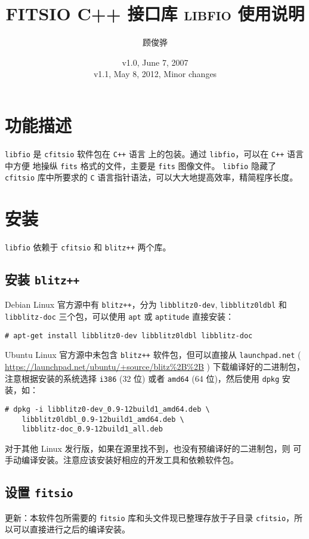 \documentclass[a4paper,12pt]{article}
\title{\textsc{FITSIO C++ 接口库 libf{}io 使用说明}}
\author{顾俊骅}
\date{v1.0, June 7, 2007 \\
  v1.1, May 8, 2012, Minor changes }
\begin{document}
\maketitle

\section{功能描述}
\texttt{libfio} 是 \texttt{cfitsio} 软件包在 \texttt{C++} 语言
上的包装。通过 \texttt{libfio}，可以在 \texttt{C++} 语言中方便
地操纵 \texttt{fits} 格式的文件，主要是 \texttt{fits} 图像文件。
\texttt{libfio} 隐藏了 \texttt{cfitsio} 库中所要求的 \texttt{C}
语言指针语法，可以大大地提高效率，精简程序长度。


\section{安装}
\texttt{libfio} 依赖于 \texttt{cfitsio} 和 \texttt{blitz++} 两个库。

\subsection{安装 \texttt{blitz++}}
Debian Linux 官方源中有 \texttt{blitz++}，分为 \texttt{libblitz0-dev},
\texttt{libblitz0ldbl} 和 \texttt{libblitz-doc} 三个包，可以使用
\texttt{apt} 或 \texttt{aptitude} 直接安装：
\begin{verbatim}
# apt-get install libblitz0-dev libblitz0ldbl libblitz-doc
\end{verbatim}

Ubuntu Linux 官方源中未包含 \texttt{blitz++} 软件包，但可以直接从
\texttt{launchpad.net} ( \url{https://launchpad.net/ubuntu/+source/blitz\%2B\%2B} )
下载编译好的二进制包，注意根据安装的系统选择 \texttt{i386} (32 位) 或者
\texttt{amd64} (64 位)，然后使用 \texttt{dpkg} 安装，如：
\begin{verbatim}
# dpkg -i libblitz0-dev_0.9-12build1_amd64.deb \
    libblitz0ldbl_0.9-12build1_amd64.deb \
    libblitz-doc_0.9-12build1_all.deb
\end{verbatim}

对于其他 Linux 发行版，如果在源里找不到，也没有预编译好的二进制包，则
可手动编译安装。注意应该安装好相应的开发工具和依赖软件包。

\subsection{设置 \texttt{fitsio}}
更新：本软件包所需要的 \texttt{fitsio} 库和头文件现已整理存放于子目录
\texttt{cfitsio}，所以可以直接进行之后的编译安装。
\end{document}
